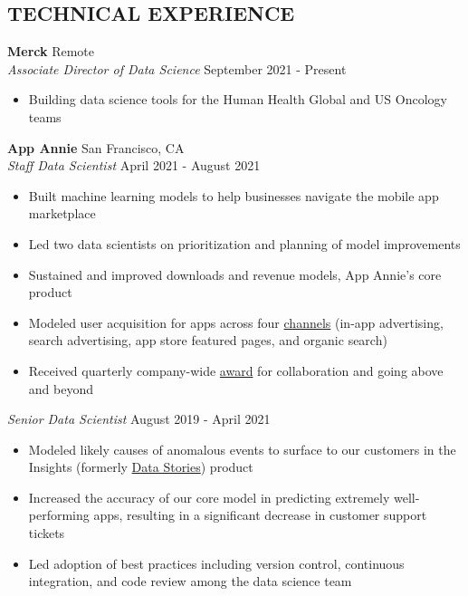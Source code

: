 \documentclass[line,margin,10pt]{res}
\begin{document}
\begin{resume}
\section{TECHNICAL EXPERIENCE}
\textbf{Merck} \hfill Remote\\
{\sl Associate Director of Data Science} \hfill September 2021 - Present
\begin{itemize}
	\item Building data science tools for the Human Health Global and US Oncology teams
\end{itemize}
\textbf{App Annie} \hfill San Francisco, CA\\
{\sl Staff  Data Scientist} \hfill April 2021 - August 2021
\begin{itemize} \itemsep -2pt
	\item Built machine learning models to help businesses navigate the mobile app marketplace
	\item Led two data scientists on prioritization and planning of model improvements
	\item Sustained and improved downloads and revenue models, App Annie's core product
	\item Modeled user acquisition for apps across four \href{https://www.appannie.com/en/insights/product-announcements/understand-paid-vs-organic-downloads-with-improved-download-channel-report/}{channels} (in-app advertising, search advertising, app store featured pages, and organic search)
	\item Received quarterly company-wide \href{https://www.linkedin.com/pulse/meet-abbie-popa-staff-data-scientist-from-our-amer-region-thomas/?trackingId=BPJh%2B6dFR%2Baz%2BUpkpGznRA%3D%3D}{award} for collaboration and going above and beyond
	\end{itemize}
	{\vspace{-0.25cm}}
	{\sl Senior Data Scientist} \hfill August 2019 - April 2021
	\begin{itemize} \itemsep -2pt
		\item Modeled likely causes of anomalous events to surface to our customers in the Insights (formerly \href{https://www.appannie.com/en/insights/product-announcements/data-stories-labs/}{Data Stories}) product
		\item Increased the accuracy of our core model in predicting extremely well-performing apps, resulting in a significant decrease in customer support tickets
		\item Led adoption of best practices including version control, continuous integration, and code review among the data science team
	\end{itemize}
	{\vspace{-0.25cm}}


\end{resume}
\end{document}
